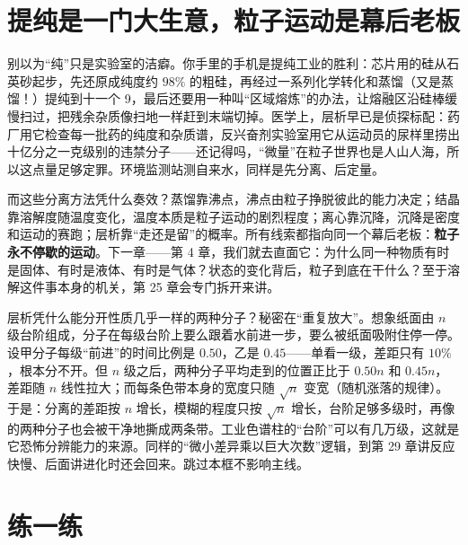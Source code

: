 \section{提纯是一门大生意，粒子运动是幕后老板}

别以为“纯”只是实验室的洁癖。你手里的手机是提纯工业的胜利：芯片用的硅从石英砂起步，先还原成纯度约 $98\%$ 的粗硅，再经过一系列化学转化和蒸馏（又是蒸馏！）提纯到十一个 9，最后还要用一种叫“区域熔炼”的办法，让熔融区沿硅棒缓慢扫过，把残余杂质像扫地一样赶到末端切掉。医学上，层析早已是侦探标配：药厂用它检查每一批药的纯度和杂质谱，反兴奋剂实验室用它从运动员的尿样里捞出十亿分之一克级别的违禁分子——还记得吗，“微量”在粒子世界也是人山人海，所以这点量足够定罪。环境监测站测自来水，同样是先分离、后定量。

而这些分离方法凭什么奏效？蒸馏靠沸点，沸点由粒子挣脱彼此的能力决定；结晶靠溶解度随温度变化，温度本质是粒子运动的剧烈程度；离心靠沉降，沉降是密度和运动的赛跑；层析靠“走还是留”的概率。所有线索都指向同一个幕后老板：\textbf{粒子永不停歇的运动}。下一章——第 4 章，我们就去直面它：为什么同一种物质有时是固体、有时是液体、有时是气体？状态的变化背后，粒子到底在干什么？至于溶解这件事本身的机关，第 25 章会专门拆开来讲。

\begin{tiaozhan}
层析凭什么能分开性质几乎一样的两种分子？秘密在“重复放大”。想象纸面由 $n$ 级台阶组成，分子在每级台阶上要么跟着水前进一步，要么被纸面吸附住停一停。设甲分子每级“前进”的时间比例是 $0.50$，乙是 $0.45$——单看一级，差距只有 $10\%$，根本分不开。但 $n$ 级之后，两种分子平均走到的位置正比于 $0.50n$ 和 $0.45n$，差距随 $n$ 线性拉大；而每条色带本身的宽度只随 $\sqrt{n}$ 变宽（随机涨落的规律）。于是：分离的差距按 $n$ 增长，模糊的程度只按 $\sqrt{n}$ 增长，台阶足够多级时，再像的两种分子也会被干净地撕成两条带。工业色谱柱的“台阶”可以有几万级，这就是它恐怖分辨能力的来源。同样的“微小差异乘以巨大次数”逻辑，到第 29 章讲反应快慢、后面讲进化时还会回来。跳过本框不影响主线。
\end{tiaozhan}

\section*{练一练}

